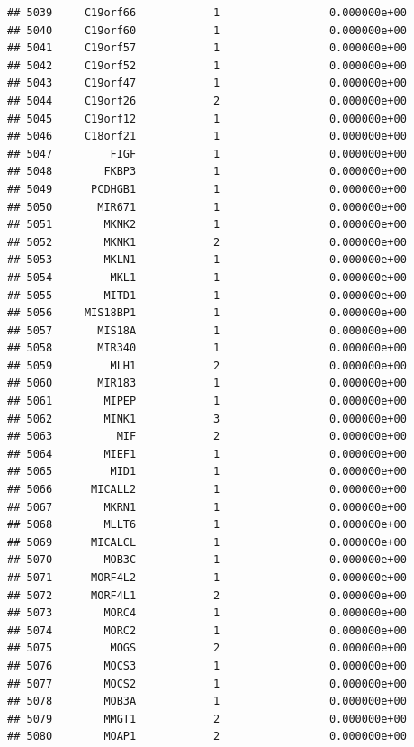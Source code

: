 \documentclass[
]{article}
\begin{document}
\begin{verbatim}
## 5039     C19orf66            1                 0.000000e+00
## 5040     C19orf60            1                 0.000000e+00
## 5041     C19orf57            1                 0.000000e+00
## 5042     C19orf52            1                 0.000000e+00
## 5043     C19orf47            1                 0.000000e+00
## 5044     C19orf26            2                 0.000000e+00
## 5045     C19orf12            1                 0.000000e+00
## 5046     C18orf21            1                 0.000000e+00
## 5047         FIGF            1                 0.000000e+00
## 5048        FKBP3            1                 0.000000e+00
## 5049      PCDHGB1            1                 0.000000e+00
## 5050       MIR671            1                 0.000000e+00
## 5051        MKNK2            1                 0.000000e+00
## 5052        MKNK1            2                 0.000000e+00
## 5053        MKLN1            1                 0.000000e+00
## 5054         MKL1            1                 0.000000e+00
## 5055        MITD1            1                 0.000000e+00
## 5056     MIS18BP1            1                 0.000000e+00
## 5057       MIS18A            1                 0.000000e+00
## 5058       MIR340            1                 0.000000e+00
## 5059         MLH1            2                 0.000000e+00
## 5060       MIR183            1                 0.000000e+00
## 5061        MIPEP            1                 0.000000e+00
## 5062        MINK1            3                 0.000000e+00
## 5063          MIF            2                 0.000000e+00
## 5064        MIEF1            1                 0.000000e+00
## 5065         MID1            1                 0.000000e+00
## 5066      MICALL2            1                 0.000000e+00
## 5067        MKRN1            1                 0.000000e+00
## 5068        MLLT6            1                 0.000000e+00
## 5069      MICALCL            1                 0.000000e+00
## 5070        MOB3C            1                 0.000000e+00
## 5071      MORF4L2            1                 0.000000e+00
## 5072      MORF4L1            2                 0.000000e+00
## 5073        MORC4            1                 0.000000e+00
## 5074        MORC2            1                 0.000000e+00
## 5075         MOGS            2                 0.000000e+00
## 5076        MOCS3            1                 0.000000e+00
## 5077        MOCS2            1                 0.000000e+00
## 5078        MOB3A            1                 0.000000e+00
## 5079        MMGT1            2                 0.000000e+00
## 5080        MOAP1            2                 0.000000e+00

\end{verbatim}
\end{document}
